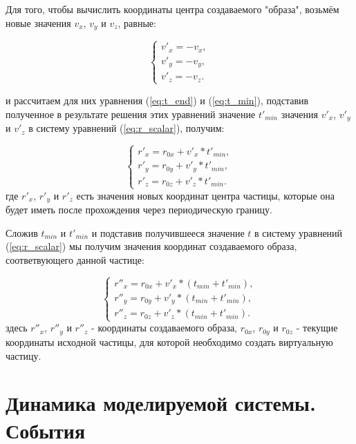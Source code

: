 \documentclass{article}
\begin{document}
Для того, чтобы вычислить координаты центра создаваемого "образа", возьмём новые значения $ v_x $, $ v_y $ и $ v_z $, равные:

\begin{equation}
    \begin{cases}
        v'_x = - v_x,
        \\
        v'_y = - v_y,
        \\
        v'_z = -v_z.
    \end{cases}
\end{equation}

и рассчитаем для них уравнения (\ref{eq:t_end}) и (\ref{eq:t_min}), подставив полученное в результате решения этих уравнений значение $ t'_{min} $  значения $ v'_x $, $ v'_y $ и $ v'_z $ в систему уравнений (\ref{eq:r_scalar}), получим:

\begin{equation}
    \begin{cases}
        r'_x = r_{0x} + v'_x * t'_{min},
        \\
        r'_y = r_{0y} + v'_y * t'_{min},
        \\
        r'_z = r_{0z} + v'_z * t'_{min}.
    \end{cases}
\end{equation}
где $ r'_x $, $ r'_y $ и $ r'_z $ есть значения новых координат центра частицы, которые она будет иметь после прохождения через периодическую границу.

Сложив $ t_{min} $ и $ t'_{min} $ и подставив получившееся значение $ t $ в систему уравнений (\ref{eq:r_scalar}) мы получим значения координат создаваемого образа, соответвующего данной частице:

\begin{equation}
    \begin{cases}
        r''_x = r_{0x} + v'_x * (t_{min} + t'_{min}),
        \\
        r''_y = r_{0y} + v'_y * (t_{min} + t'_{min}),
        \\
        r''_z = r_{0z} + v'_z * (t_{min} + t'_{min}).
    \end{cases}
\end{equation}
здесь $ r''_x $, $ r''_y $ и $ r''_z $ - координаты создаваемого образа, $ r_{0x} $, $ r_{0y} $ и $ r_{0z} $ - текущие координаты исходной частицы, для которой необходимо создать виртуальную частицу.

\newpage
\section{Динамика моделируемой системы. События}
\end{document}

